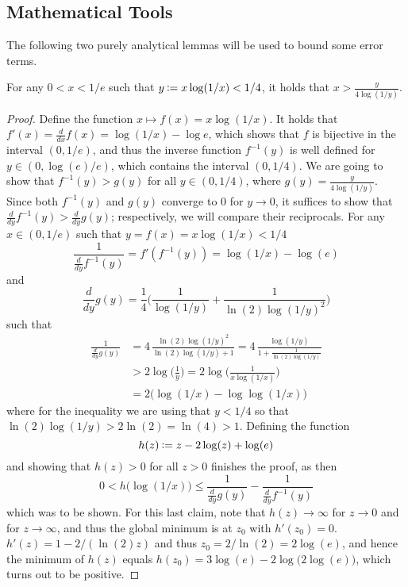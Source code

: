 \subsection{Mathematical Tools}
The following two purely analytical lemmas will be used to bound some error terms.
\begin{lemma} \label{lem:delta}
  For any $0 < x < 1/e$ such that $y \assign x \log(1/x) < 1/4$,
  it holds that $x > \frac{y}{4 \log(1/y)}$.
\end{lemma}
\begin{proof}
  Define the function $x \mapsto f(x) = x \log(1/x)$. It holds that
  $f'(x) = \frac{d}{dx}f(x) = \log(1/x)-\log e$, which shows that $f$
  is bijective in the interval $(0,1/e)$, and thus the inverse
  function $f^{-1}(y)$ is well defined for $y \in (0,\log(e)/e)$,
  which contains the interval $(0,1/4)$. We are going to show that
  $f^{-1}(y) > g(y)$ for all $y \in (0,1/4)$, where $g(y) = \frac{y}{4
    \log(1/y)}$. Since both $f^{-1}(y)$ and $g(y)$ converge to 0 for
  $y \rightarrow 0$, it suffices to show that $\frac{d}{dy} f^{-1}(y)
  > \frac{d}{dy} g(y)$; respectively, we will compare their
  reciprocals. For any $x \in (0,1/e)$ such that $y = f(x) = x
  \log(1/x) < 1/4$
$$
\frac{1}{\frac{d}{dy} f^{-1}(y)} = f'(f^{-1}(y)) = \log(1/x)-\log(e)
$$
and
$$
\frac{d}{dy} g(y) = \frac{1}{4} \bigg( \frac{1}{\log(1/y)} + \frac{1}{\ln(2) \log(1/y)^2} \bigg)
$$
such that 
\begin{align*}
\frac{1}{\frac{d}{dy} g(y)} &= 4 \, \frac{\ln(2)\log(1/y)^2}{\ln(2) \log(1/y) + 1} 
= 4 \, \frac{\log(1/y)}{1+\frac{1}{\ln(2) \log(1/y)}}\\
& > 2 \log\Big(\frac{1}{y}\Big) 
= 2 \log\Big(\frac{1}{x \log(1/x)}\Big) \\[0.7ex]
&= 2\big(\log(1/x) - \log\log(1/x)\big)
\end{align*} 
where for the inequality we are using that $y < 1/4$ so that $\ln(2) \log(1/y) > 2\ln(2) = \ln(4) > 1$. 
Defining the function
$$
h(z) \assign z - 2\log(z) + \log(e)
$$
and showing that $h(z) > 0$ for all $z>0$ finishes the proof, as then
$$
0 < h\big(\log(1/x)\big) \leq  \frac{1}{\frac{d}{dy} g(y)} - \frac{1}{\frac{d}{dy} f^{-1}(y)}
$$
which was to be shown. 
For this last claim, note that $h(z) \rightarrow \infty$ for $z
\rightarrow 0$ and for $z \rightarrow \infty$, and thus the global
minimum is at $z_0$ with $h'(z_0) = 0$. $h'(z) = 1 - 2/(\ln(2)z)$ and
thus $z_0 = 2/\ln(2) = 2\log(e)$, and hence the minimum of $h(z)$ equals
$h(z_0) = 3 \log(e) - 2\log\big(2\log(e)\big)$, which turns out to be positive. 
\end{proof}

